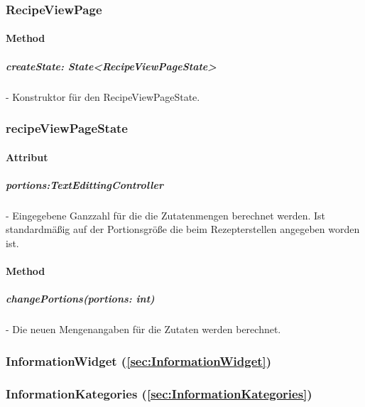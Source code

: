\documentclass[parskip=full]{scrartcl}
\begin{document}
    \subsubsection{RecipeViewPage}
        \paragraph*{Method}
            \subparagraph*{createState: State<RecipeViewPageState>} - Konstruktor für den RecipeViewPageState.
        
    \subsubsection{recipeViewPageState}
        \paragraph*{Attribut}
            \subparagraph*{portions:TextEdittingController} - Eingegebene Ganzzahl für die die Zutatenmengen berechnet werden. Ist standardmäßig auf der Portionsgröße die beim Rezepterstellen angegeben worden ist.
    
        \paragraph*{Method}
            \subparagraph*{changePortions(portions: int)} - Die neuen Mengenangaben für die Zutaten werden berechnet.

    \subsubsection{InformationWidget (\autoref{sec:InformationWidget})}

    \subsubsection{InformationKategories (\autoref{sec:InformationKategories})}
\end{document}

